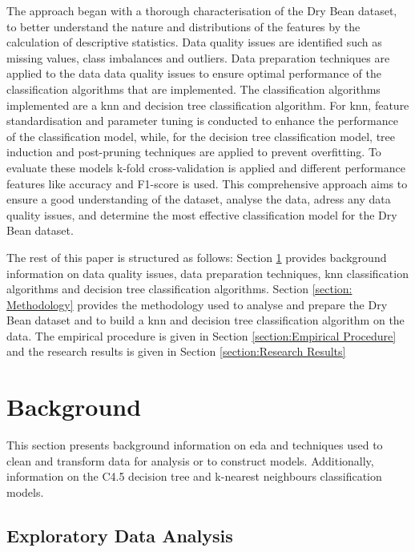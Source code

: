 \documentclass[10pt, conference]{IEEEtran}
\begin{document}
The approach began with a thorough characterisation of the Dry Bean dataset, to better understand the nature and distributions
of the features by the calculation of descriptive statistics. Data quality issues are identified such as missing values,
class imbalances and outliers. Data preparation techniques are applied to the data data quality issues to ensure optimal
performance of the classification algorithms that are implemented. The classification algorithms implemented are a
\acrfull{knn} and decision tree classification algorithm. For \acrshort{knn}, feature standardisation and parameter
tuning is conducted to enhance the performance of the classification model, while, for the decision tree classification model,
tree induction and post-pruning techniques are applied to prevent overfitting. To evaluate these models k-fold cross-validation
is applied and different performance features like accuracy and F1-score is used. This comprehensive approach aims to ensure
a good understanding of the dataset, analyse the data, adress any data quality issues, and determine the most effective
classification model for the Dry Bean dataset.

The rest of this paper is structured as follows: Section \ref{section:Background} provides background information on
data quality issues, data preparation techniques, \acrshort{knn} classification algorithms and decision tree classification algorithms.
Section \ref{section: Methodology} provides the methodology used to analyse and prepare the Dry Bean dataset and to build a
\acrshort{knn} and decision tree classification algorithm on the data. The empirical procedure is given in Section
\ref{section:Empirical Procedure} and the research results is given in Section \ref{section:Research Results}

\section{Background} \label{section:Background}

This section presents background information on \acrshort{eda} and techniques used to clean and transform data
for analysis or to construct models. Additionally, information on the C4.5 decision tree and k-nearest neighbours
classification models.

\subsection{Exploratory Data Analysis}\label{EDA_background}
\end{document}
